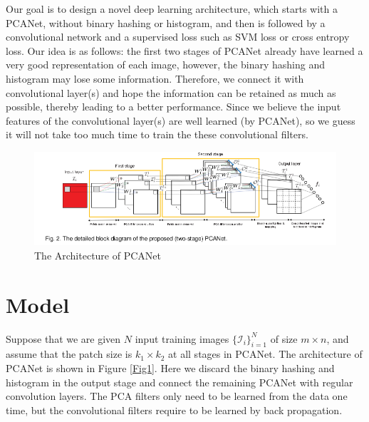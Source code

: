 \documentclass{article} %
\begin{document}
Our goal is to design a novel deep learning architecture, which starts with a PCANet, without binary hashing or histogram, and then is followed by a convolutional network and a supervised loss such as SVM loss or cross entropy loss. Our idea is as follows: the first two stages of PCANet already have learned a very good representation of each image, however, the binary hashing and histogram may lose some information. Therefore, we connect it with convolutional layer(s) and hope the information can be retained as much as possible, thereby leading to a better performance. Since we believe the input features of the convolutional layer(s) are well learned (by PCANet), so we guess it will not take too much time to train the these convolutional filters. 






\begin{figure}[h] \label{Fig1}
\vspace{-15pt} \centering
\includegraphics[scale=1.7,width=15cm]{pcanetstructure.png}
\vspace{-20pt}\caption{The Architecture of PCANet}\label{Figure: bspline}
\end{figure}


\section{Model} 
Suppose that we are given $N$ input training images $\{\mathcal{I}_i\}_{i=1}^N $ of size $m \times n$, and assume that the patch size is $k_1 \times k_2$ at all stages in PCANet. The architecture of PCANet is shown in Figure \ref{Fig1}. Here we discard the binary hashing and histogram in the output stage and connect the remaining PCANet with regular convolution layers. The PCA filters only need to be learned from the data one time, but the convolutional filters require to be learned by back propagation. 
\end{document}
